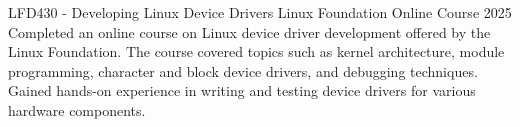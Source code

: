 

\begin{cventries}

  \cventry
    {LFD430 - Developing Linux Device Drivers}
    {Linux Foundation} %
    {Online Course} %
    {2025} %
    {
      Completed an online course on Linux device driver development offered by the Linux Foundation. The course covered topics such as kernel architecture, module programming, character and block device drivers, and debugging techniques. Gained hands-on experience in writing and testing device drivers for various hardware components.
    }



\end{cventries}
